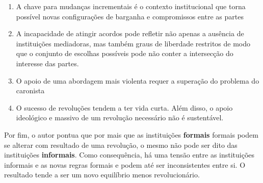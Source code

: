\begin{enumerate}
	\item A chave para mudanças incrementais é o contexto institucional que torna possível novas configurações de barganha e compromissos entre as partes
	\item A incapacidade de atingir acordos pode refletir não apenas a ausência de instituições mediadoras, mas também graus de liberdade restritos de modo que o conjunto de escolhas possíveis pode não conter a intersecção do interesse das partes.
	\item O apoio de uma abordagem mais violenta requer a superação do problema do caronista
	\item O sucesso de revoluções tendem a ter vida curta. Além disso, o apoio ideológico e massivo de um revolução necessário não é sustentável.
\end{enumerate}

Por fim, o autor pontua que por mais que as instituições \textbf{formais} formais podem se alterar com resultado de uma revolução, o mesmo não pode ser dito das instituições \textbf{informais}. Como consequência, há uma tensão entre as instituições informais e as novas regras formais e podem até ser inconsistentes entre si. O resultado tende a ser um novo equilíbrio menos revolucionário.
